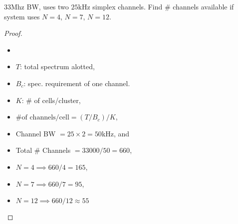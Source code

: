 \documentclass[./answersheet.tex]{subfiles}
\begin{document}
\begin{wts}
    $33$Mhz BW, uses two $25$kHz simplex channels. Find \# channels available if system uses $N=4$, $N=7$, $N=12$.
\end{wts}
\begin{proof}
    \begin{itemize}[noitemsep]
    \item[]
    \item $T$: total spectrum alotted, 
    \item $B_c$: spec. requirement of one channel.
    \item $K$: \# of cells/cluster,
    \item $\text{\# of channels/cell}=(T/B_c)/K$,
    \item Channel BW $= 25\times 2=50$kHz, and
    \item Total \# Channels $= 33000/50=660$,
    \item $N=4\implies 660/4=165$,
    \item $N=7\implies 660/7=95$,
    \item $N=12\implies 660/12\approx 55$
\end{itemize}
\end{proof}
\end{document}
